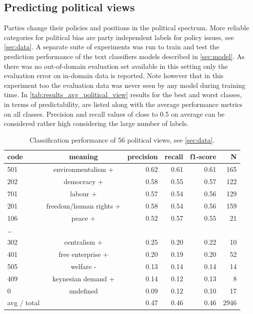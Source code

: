 \documentclass{article}
\begin{document}
\subsection{Predicting political views}
Parties change their policies and positions in the political spectrum. More reliable categories for political bias are party independent labels for policy issues, see \autoref{sec:data}. A separate suite of experiments was run to train and test the prediction performance of the text classifiers models described in \autoref{sec:model}. As there was no out-of-domain evaluation set available in this setting only the evaluation error on in-domain data is reported. Note however that in this experiment too the evaluation data was never seen by any model during training time.
In \autoref{tab:results_avg_political_view} results for the best and worst classes, in terms of predictability, are listed along with the average performance metrics on all classes.
Precision and recall values of close to 0.5 on average can be considered rather high considering the large number of labels. \\

\begin{table}[t]
\caption{
\label{tab:results_avg_political_view}
Classification performance of 56 political views, see \autoref{sec:data}.
}
\begin{center}
\begin{tabular}{lcrrrr}
code & meaning  &      precision    &recall &  f1-score  & N\\
\hline\hline
%
       501  & environmentalism + &      0.62   &   0.61 &     0.61  &     165\\
        202 &   democracy + &   0.58  &    0.55   &   0.57   &    122\\
        701    & labour +&  0.57  &    0.54   &   0.56      & 129\\
                201    &freedom/human rights +  & 0.58   &   0.54   &   0.56   &    159\\
         106   & peace + & 0.52&      0.57   &   0.55    &    21\\
\dots\\
        302     &centralism + & 0.25     & 0.20  &    0.22  &      10\\
        401    &  free enterprise + &0.20    &  0.19    &  0.20   &     52\\
        505    &welfare - &  0.13   &   0.14   &   0.14   &     14\\
        409    & keynesian demand +&  0.14  &    0.12  &    0.13   &      8\\
            0    & undefined &  0.09  &    0.12   &   0.10    &    17\\
            \hline
avg / total  &  &  0.47    &  0.46 &     0.46 &     2946\\
%
\end{tabular}
\end{center}
\end{table}
\end{document}
